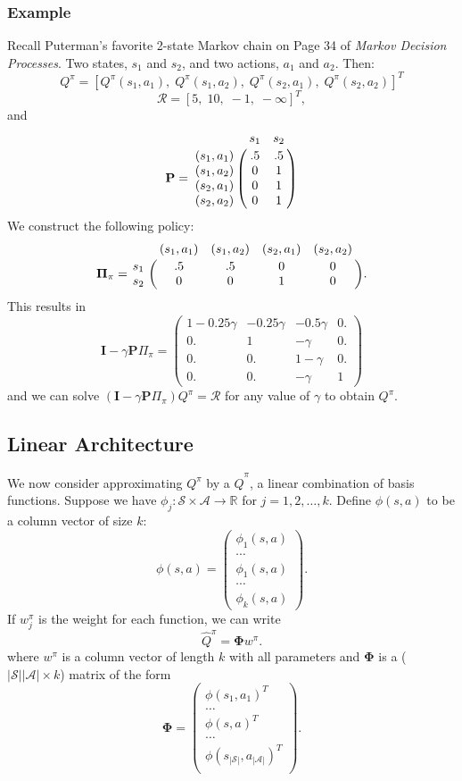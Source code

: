 \documentclass{article}
\newcommand{\bra}[1]{\left[#1\right]}
\newcommand{\abs}[1]{\left|#1\right|}
\newcommand{\R}{\mathbb{R}}
\begin{document}
\subsubsection*{Example} %
\label{ssub:example}
Recall Puterman's favorite 2-state Markov chain on Page 34 of \emph{Markov Decision Processes}. Two states, $s_{1}$ and $s_{2}$, and two actions, $a_{1}$ and $a_{2}$. Then:
\[
	Q^{\pi}=\bra{
		Q^{\pi}(s_{1},a_{1}),\; 
		Q^{\pi}(s_{1},a_{2}),\; 
		Q^{\pi}(s_{2},a_{1}),\; 
		Q^{\pi}(s_{2},a_{2})}^{T}
\]
\[
	\mathcal{R}=\bra{
		5,\; 
		10,\; 
		-1,\; 
		-\infty}^{T},
\]and
\[
	\mathbf{P}=\bordermatrix{
		& s_{1} & s_{2} \cr
		(s_{1},a_{1}) &.5&.5   \cr
		(s_{1},a_{2}) &0&1   \cr
		(s_{2},a_{1}) &0&1   \cr
		(s_{2},a_{2}) &0&1
	}
\]
We construct the following policy:
\[
	\mathbf{\Pi}_{\pi}=\bordermatrix{
	& (s_{1},a_{1}) & (s_{1},a_{2}) & (s_{2},a_{1}) & (s_{2},a_{2}) \cr
	s_{1} &.5&.5&0&0\cr
	s_{2} &0&0&1&0\cr
	}.
\]
This results in 
\[
	\mathbf{I}-\gamma \mathbf{P}\Pi_{\pi}=\left(
	\begin{matrix}
	 1-0.25 \gamma  & -0.25 \gamma  & -0.5 \gamma  & 0. \\
	 0. & 1 & -\gamma  & 0. \\
	 0. & 0. & 1- \gamma  & 0. \\
	 0. & 0. & -\gamma  & 1
	\end{matrix}
	\right)
\]
and we can solve $(\mathbf{I}-\gamma \mathbf{P}\Pi_{\pi})Q^{\pi}=\mathcal{R}$  for any value of $\gamma$ to obtain $Q^{\pi}$. 

\subsection*{Linear Architecture} %
\label{sec:linear_architecture}
We now consider approximating $Q^{\pi}$ by a $\hat{Q}^{\pi}$, a linear combination of basis functions.
Suppose we have $\phi_{j}:\mathcal{S}\times\mathcal{A}\rightarrow \R$ for $j=1,2,\ldots,k$. 
Define $\phi(s,a)$ to be a column vector of size $k$:
\[
	\phi(s,a)=\left(\begin{smallmatrix}
		\phi_{1}(s,a) \\ \cdots \\ \phi_{1}(s,a) \\ \cdots \\ \phi_{k}(s,a)
	\end{smallmatrix}\right).
\]
If $w_{j}^{\pi}$ is the weight for each function, we can write 
\[
	\hat{Q}^{\pi}=\mathbf{\Phi}w^{\pi}.
\]
where $w^{\pi}$ is a column vector of length $k$ with all parameters and $\mathbf{\Phi}$ is a ($\abs{\mathcal{S}}\abs{\mathcal{A}}\times k$) matrix of the form
\[
	\mathbf{\Phi}=\begin{pmatrix}
		\phi(s_{1},a_{1})^{T}\\
		\ldots\\
		\phi(s,a)^{T}\\
		\ldots\\
		\phi(s_{\abs{\mathcal{S}}},a_{\abs{\mathcal{A}}})^{T}\\
	\end{pmatrix}.
\]
\end{document}
